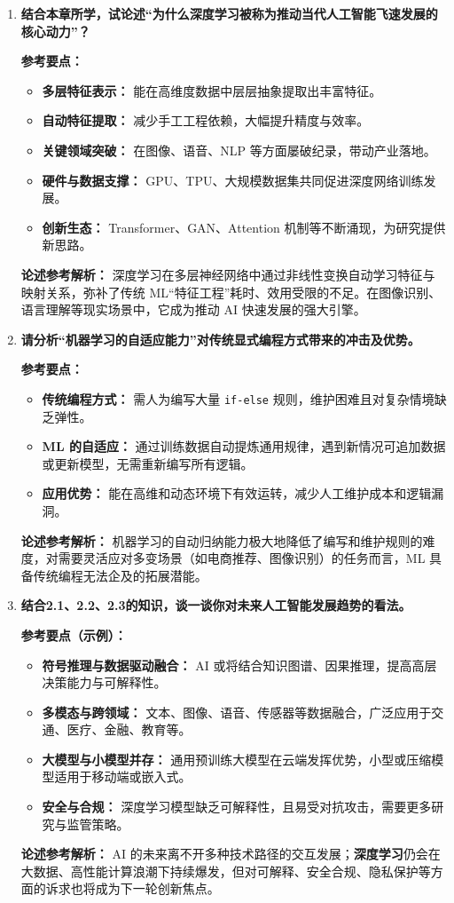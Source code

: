 \begin{enumerate}
  \item \textbf{结合本章所学，试论述“为什么深度学习被称为推动当代人工智能飞速发展的核心动力”？}

  \textbf{参考要点：}
  \begin{itemize}
    \item \textbf{多层特征表示：} 能在高维度数据中层层抽象提取出丰富特征。
    \item \textbf{自动特征提取：} 减少手工工程依赖，大幅提升精度与效率。
    \item \textbf{关键领域突破：} 在图像、语音、NLP 等方面屡破纪录，带动产业落地。
    \item \textbf{硬件与数据支撑：} GPU、TPU、大规模数据集共同促进深度网络训练发展。
    \item \textbf{创新生态：} Transformer、GAN、Attention 机制等不断涌现，为研究提供新思路。
  \end{itemize}

  \textbf{论述参考解析：}
  深度学习在多层神经网络中通过非线性变换自动学习特征与映射关系，弥补了传统 ML“特征工程”耗时、效用受限的不足。在图像识别、语言理解等现实场景中，它成为推动 AI 快速发展的强大引擎。

  \item \textbf{请分析“机器学习的自适应能力”对传统显式编程方式带来的冲击及优势。}

  \textbf{参考要点：}
  \begin{itemize}
    \item \textbf{传统编程方式：} 需人为编写大量 \texttt{if-else} 规则，维护困难且对复杂情境缺乏弹性。
    \item \textbf{ML 的自适应：} 通过训练数据自动提炼通用规律，遇到新情况可追加数据或更新模型，无需重新编写所有逻辑。
    \item \textbf{应用优势：} 能在高维和动态环境下有效运转，减少人工维护成本和逻辑漏洞。
  \end{itemize}

  \textbf{论述参考解析：}
  机器学习的自动归纳能力极大地降低了编写和维护规则的难度，对需要灵活应对多变场景（如电商推荐、图像识别）的任务而言，ML 具备传统编程无法企及的拓展潜能。

  \item \textbf{结合2.1、2.2、2.3的知识，谈一谈你对未来人工智能发展趋势的看法。}

  \textbf{参考要点（示例）：}
  \begin{itemize}
    \item \textbf{符号推理与数据驱动融合：} AI 或将结合知识图谱、因果推理，提高高层决策能力与可解释性。
    \item \textbf{多模态与跨领域：} 文本、图像、语音、传感器等数据融合，广泛应用于交通、医疗、金融、教育等。
    \item \textbf{大模型与小模型并存：} 通用预训练大模型在云端发挥优势，小型或压缩模型适用于移动端或嵌入式。
    \item \textbf{安全与合规：} 深度学习模型缺乏可解释性，且易受对抗攻击，需要更多研究与监管策略。
  \end{itemize}

  \textbf{论述参考解析：}
  AI 的未来离不开多种技术路径的交互发展；\textbf{深度学习}仍会在大数据、高性能计算浪潮下持续爆发，但对可解释、安全合规、隐私保护等方面的诉求也将成为下一轮创新焦点。

\end{enumerate}

